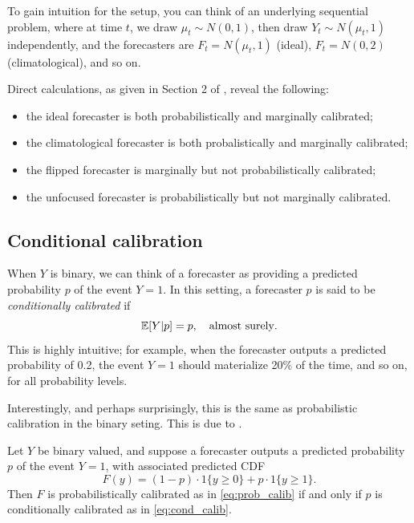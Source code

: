\documentclass{article}
\begin{document}
To gain intuition for the setup, you can think of an underlying sequential
problem, where at time $t$, we draw $\mu_t \sim N(0,1)$, then draw $Y_t \sim
N(\mu_t, 1)$ independently, and the forecasters are $F_t = N(\mu_t, 1)$ (ideal),
$F_t = N(0, 2)$ (climatological), and so on.

Direct calculations, as given in Section 2 of \citet{gneiting2007probabilistic}, 
reveal the following: 

\begin{itemize}
\item the ideal forecaster is both probabilistically and marginally calibrated;  
\item the climatological forecaster is both probalistically and marginally
  calibrated;
\item the flipped forecaster is marginally but not probabilistically
  calibrated; 
\item the unfocused forecaster is probabilistically but not marginally
  calibrated.
\end{itemize}

\subsection{Conditional calibration}

When $Y$ is binary, we can think of a forecaster as providing a predicted
probability $p$ of the event $Y = 1$. In this setting, a forecaster $p$ is said
to be \emph{conditionally calibrated} if
\begin{equation}
\label{eq:cond_calib}
\mathbb{E}[Y|p] = p, \quad \text{almost surely}.  
\end{equation}
This is highly intuitive; for example, when the forecaster outputs a predicted
probability of 0.2, the event $Y=1$ should materialize 20\% of the time, and so
on, for all probability levels. 

Interestingly, and perhaps surprisingly, this is the same as probabilistic
calibration in the binary seting. This is due to \citet{gneiting2013combining}. 

\begin{theorem}
Let $Y$ be binary valued, and suppose a forecaster outputs a predicted
probability $p$ of the event $Y = 1$, with associated predicted CDF 
\[
F(y) = (1-p) \cdot 1\{y \geq 0\} +  p \cdot 1\{y \geq 1\}.
\]
Then $F$ is probabilistically calibrated as in \eqref{eq:prob_calib} if and only 
if $p$ is conditionally calibrated as in \eqref{eq:cond_calib}. 
\end{theorem}
\end{document}
